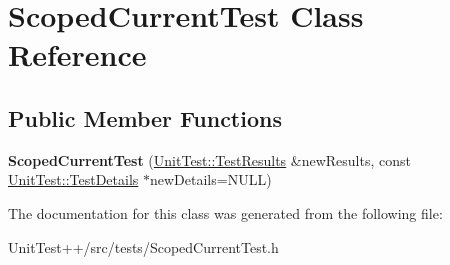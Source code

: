 \hypertarget{classScopedCurrentTest}{\section{Scoped\-Current\-Test Class Reference}
\label{classScopedCurrentTest}
}
\subsection*{Public Member Functions}
\begin{DoxyCompactItemize}
\item 
\hypertarget{classScopedCurrentTest_acfeecc65d3a7468123b61f5ba1fe2641}{{\bfseries Scoped\-Current\-Test} (\hyperlink{classUnitTest_1_1TestResults}{Unit\-Test\-::\-Test\-Results} \&new\-Results, const \hyperlink{classUnitTest_1_1TestDetails}{Unit\-Test\-::\-Test\-Details} $\ast$new\-Details=N\-U\-L\-L)}\label{classScopedCurrentTest_acfeecc65d3a7468123b61f5ba1fe2641}

\end{DoxyCompactItemize}


The documentation for this class was generated from the following file\-:\begin{DoxyCompactItemize}
\item 
Unit\-Test++/src/tests/Scoped\-Current\-Test.\-h\end{DoxyCompactItemize}
